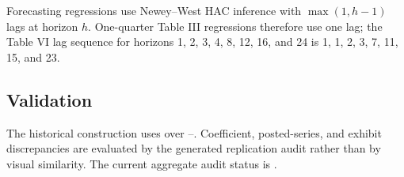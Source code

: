 Forecasting regressions use Newey--West HAC inference with
$\max(1,h-1)$ lags at horizon $h$. One-quarter Table III regressions
therefore use one lag; the Table VI lag sequence for horizons
1, 2, 3, 4, 8, 12, 16, and 24 is 1, 1, 2, 3, 7, 11, 15, and 23.

\subsection{Validation}

The historical construction uses \CayHistoricalDefinition{} over
\HistoricalSampleStart--\HistoricalSampleEnd. Coefficient, posted-series, and
exhibit discrepancies are evaluated by the generated replication audit rather
than by visual similarity. The current aggregate audit status is
\texttt{\OverallReplicationStatus}.
